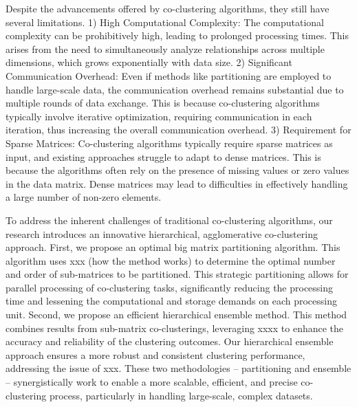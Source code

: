 Despite the advancements offered by co-clustering algorithms, they still have several limitations. 1) High Computational Complexity: The computational complexity can be prohibitively high, leading to prolonged processing times. This arises from the need to simultaneously analyze relationships across multiple dimensions, which grows exponentially with data size.
2) Significant Communication Overhead: Even if methods like partitioning are employed to handle large-scale data, the communication overhead remains substantial due to multiple rounds of data exchange. This is because co-clustering algorithms typically involve iterative optimization, requiring communication in each iteration, thus increasing the overall communication overhead.
3) Requirement for Sparse Matrices: Co-clustering algorithms typically require sparse matrices as input, and existing approaches struggle to adapt to dense matrices. This is because the algorithms often rely on the presence of missing values or zero values in the data matrix. Dense matrices may lead to difficulties in effectively handling a large number of non-zero elements.



To address the inherent challenges of traditional co-clustering algorithms, our research introduces an innovative hierarchical, agglomerative co-clustering approach. First,  we propose an optimal big matrix partitioning algorithm. This algorithm uses xxx (how the method works) to determine the optimal number and order of sub-matrices to be partitioned. This strategic partitioning allows for parallel processing of co-clustering tasks, significantly reducing the processing time and lessening the computational and storage demands on each processing unit.  
Second, we propose an efficient hierarchical ensemble method. This method combines results from sub-matrix co-clusterings, leveraging xxxx to enhance the accuracy and reliability of the clustering outcomes. Our hierarchical ensemble approach ensures a more robust and consistent clustering performance, addressing the issue of xxx. 
These two methodologies – partitioning and ensemble – synergistically work to enable a more scalable, efficient, and precise co-clustering process, particularly in handling large-scale, complex datasets.

